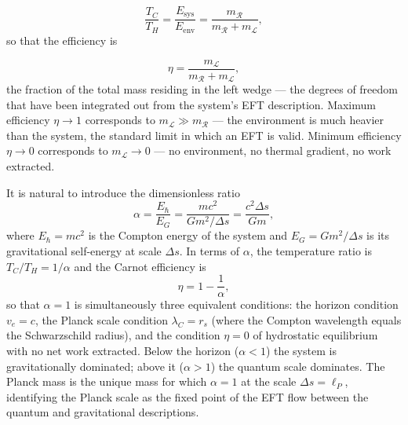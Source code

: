 \documentclass[12pt,a4paper]{article}
\begin{document}
\begin{equation}
\frac{T_C}{T_H} = \frac{E_{\text{sys}}}{E_{\text{env}}} 
= \frac{m_\mathcal{R}}{m_\mathcal{R} + m_\mathcal{L}},
\label{eq:temp_ratio}
\end{equation}
so that the efficiency is

\begin{equation}
\eta = \frac{m_\mathcal{L}}{m_\mathcal{R} + m_\mathcal{L}},
\end{equation}
the fraction of the total mass residing in the left 
wedge --- the degrees of freedom that have been 
integrated out from the system's EFT description. 
Maximum efficiency $\eta \to 1$ corresponds to 
$m_\mathcal{L} \gg m_\mathcal{R}$ --- the environment 
is much heavier than the system, the standard limit 
in which an EFT is valid. Minimum efficiency $\eta 
\to 0$ corresponds to $m_\mathcal{L} \to 0$ --- no 
environment, no thermal gradient, no work extracted.

It is natural to introduce the dimensionless ratio
%
\begin{equation}
    \alpha = \frac{E_\hbar}{E_G} = \frac{mc^2}{Gm^2/\Delta s}
           = \frac{c^2 \Delta s}{Gm},
    \label{eq:alpha}
\end{equation}
%
where $E_\hbar = mc^2$ is the Compton energy of the system 
and $E_G = Gm^2/\Delta s$ is its gravitational self-energy 
at scale $\Delta s$. In terms of $\alpha$, the temperature 
ratio is $T_C/T_H = 1/\alpha$ and the Carnot efficiency is
%
\begin{equation}
    \eta = 1 - \frac{1}{\alpha},
\end{equation}
%
so that $\alpha = 1$ is simultaneously three equivalent 
conditions: the horizon condition $v_e = c$, the Planck 
scale condition $\lambda_C = r_s$ (where the Compton 
wavelength equals the Schwarzschild radius), and the 
condition $\eta = 0$ of hydrostatic equilibrium with no 
net work extracted. Below the horizon ($\alpha < 1$) the 
system is gravitationally dominated; above it 
($\alpha > 1$) the quantum scale dominates. The Planck 
mass is the unique mass for which $\alpha = 1$ at the 
scale $\Delta s = \ell_P$, identifying the Planck scale 
as the fixed point of the EFT flow between the quantum 
and gravitational descriptions.
\end{document}
